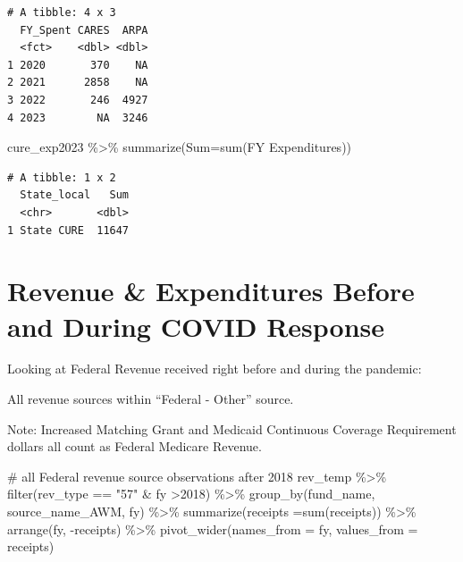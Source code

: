 \documentclass[
  letterpaper,
  DIV=11,
  numbers=noendperiod]{scrreport}
\newenvironment{Shaded}{\begin{snugshade}}{\end{snugshade}}
\newcommand{\AttributeTok}[1]{\textcolor[rgb]{0.40,0.45,0.13}{#1}}
\newcommand{\CommentTok}[1]{\textcolor[rgb]{0.37,0.37,0.37}{#1}}
\newcommand{\DecValTok}[1]{\textcolor[rgb]{0.68,0.00,0.00}{#1}}
\newcommand{\FunctionTok}[1]{\textcolor[rgb]{0.28,0.35,0.67}{#1}}
\newcommand{\NormalTok}[1]{\textcolor[rgb]{0.00,0.23,0.31}{#1}}
\newcommand{\SpecialCharTok}[1]{\textcolor[rgb]{0.37,0.37,0.37}{#1}}
\newcommand{\StringTok}[1]{\textcolor[rgb]{0.13,0.47,0.30}{#1}}
\begin{document}
\begin{verbatim}
# A tibble: 4 x 3
  FY_Spent CARES  ARPA
  <fct>    <dbl> <dbl>
1 2020       370    NA
2 2021      2858    NA
3 2022       246  4927
4 2023        NA  3246
\end{verbatim}

\begin{Shaded}
\begin{Highlighting}[]
\NormalTok{cure\_exp2023 }\SpecialCharTok{\%\textgreater{}\%} \FunctionTok{summarize}\NormalTok{(}\AttributeTok{Sum=}\FunctionTok{sum}\NormalTok{(}\StringTok{\textasciigrave{}}\AttributeTok{FY Expenditures}\StringTok{\textasciigrave{}}\NormalTok{))}
\end{Highlighting}
\end{Shaded}

\begin{verbatim}
# A tibble: 1 x 2
  State_local   Sum
  <chr>       <dbl>
1 State CURE  11647
\end{verbatim}

\hypertarget{revenue-expenditures-before-and-during-covid-response}{%
\section{Revenue \& Expenditures Before and During COVID
Response}\label{revenue-expenditures-before-and-during-covid-response}}

Looking at Federal Revenue received right before and during the
pandemic:

All revenue sources within ``Federal - Other'' source.

Note: Increased Matching Grant and Medicaid Continuous Coverage
Requirement dollars all count as Federal Medicare Revenue.

\begin{Shaded}
\begin{Highlighting}[]
\CommentTok{\# all Federal revenue source observations after 2018}
\NormalTok{rev\_temp }\SpecialCharTok{\%\textgreater{}\%} 
  \FunctionTok{filter}\NormalTok{(rev\_type }\SpecialCharTok{==} \StringTok{"57"} \SpecialCharTok{\&}\NormalTok{ fy }\SpecialCharTok{\textgreater{}}\DecValTok{2018}\NormalTok{) }\SpecialCharTok{\%\textgreater{}\%} 
  \FunctionTok{group\_by}\NormalTok{(fund\_name, source\_name\_AWM,  fy) }\SpecialCharTok{\%\textgreater{}\%} 
  \FunctionTok{summarize}\NormalTok{(}\AttributeTok{receipts =}\FunctionTok{sum}\NormalTok{(receipts)) }\SpecialCharTok{\%\textgreater{}\%} 
  \FunctionTok{arrange}\NormalTok{(fy, }\SpecialCharTok{{-}}\NormalTok{receipts) }\SpecialCharTok{\%\textgreater{}\%} 
  \FunctionTok{pivot\_wider}\NormalTok{(}\AttributeTok{names\_from =}\NormalTok{ fy, }\AttributeTok{values\_from =}\NormalTok{ receipts)}
\end{Highlighting}
\end{Shaded}
\end{document}
